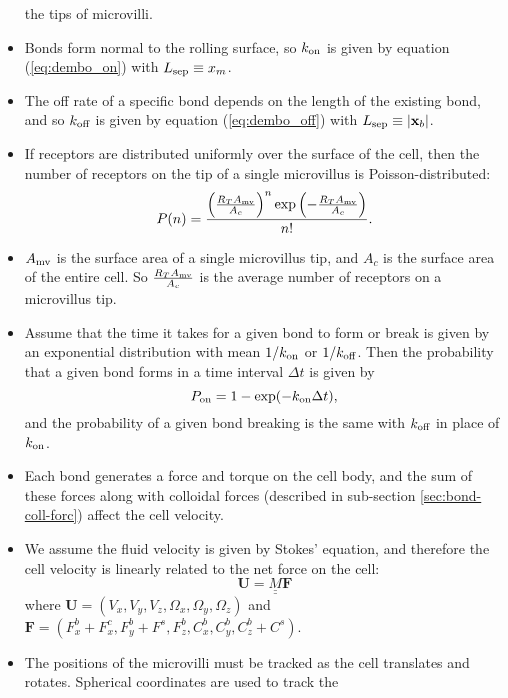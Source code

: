 \documentclass[
10pt, %
letterpaper, %
twocolumn, %
landscape %
]{article}
\newcommand{\mv}{\textnormal{mv}}
\newcommand{\x}{\mathbf{x}}
\newcommand{\on}{\textnormal{on}}
\newcommand{\off}{\textnormal{off}}
\newcommand{\sep}{\textnormal{sep}}
\begin{document}
\begin{itemize}
  the tips of microvilli.
\item Bonds form normal to the rolling surface, so $k_\on$ is given by
  equation (\ref{eq:dembo_on}) with $L_\sep \equiv x_m$.
\item The off rate of a specific bond depends on the length of the
  existing bond, and so $k_\off$ is given by equation
  (\ref{eq:dembo_off}) with $L_\sep \equiv |\x_b|$.
\item If receptors are distributed uniformly over the surface of the
  cell, then the number of receptors on the tip of a single
  microvillus is Poisson-distributed:
  \begin{equation}
    \label{eq:receptor_distribution}
    P(n) = \frac{\left(\frac{R_T A_\mv}{A_c}\right)^n \exp
      \left(-\frac{R_T A_\mv}{A_c}\right)}{n!}.
  \end{equation}
\item $A_\mv$ is the surface area of a single microvillus tip, and
  $A_c$ is the surface area of the entire cell. So $\frac{R_T
    A_\mv}{A_c}$ is the average number of receptors on a microvillus
  tip.
\item Assume that the time it takes for a given bond to form or break is
  given by an exponential distribution with mean $1/k_\on$ or
  $1/k_\off$. Then the probability that a given bond forms in a time
  interval $\Delta t$ is given by
  \begin{equation}
    \label{eq:prob_bond_form}
    P_\on = 1 - \exp(-k_\on \Delta t),
  \end{equation}
  and the probability of a given bond breaking is the same with
  $k_\off$ in place of $k_\on$.
\item Each bond generates a force and torque on the cell body, and the
  sum of these forces along with colloidal forces (described in
  sub-section \ref{sec:bond-coll-forc}) affect the cell velocity.
\item We assume the fluid velocity is given by Stokes' equation, and
  therefore the cell velocity is linearly related to the net force on
  the cell:
  \begin{equation*}
    \mathbf{U} = \underline{\underline{M}} \mathbf{F}
  \end{equation*}
where $\mathbf{U} = (V_x, V_y, V_z, \Omega_x, \Omega_y, \Omega_z)$ and
$\mathbf{F} = (F^b_x + F^c_x, F^b_y + F^s, F^b_z, C^b_x, C^b_y, C^b_z
+ C^s)$.
\item The positions of the microvilli must be tracked as the cell
  translates and rotates. Spherical coordinates are used to track the

\end{itemize}
\end{document}
